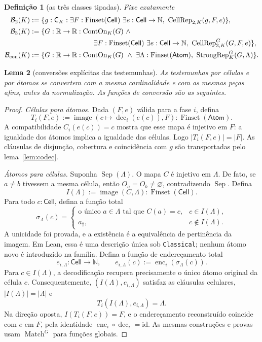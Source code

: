 \documentclass[11pt,a4paper]{article}
\newtheorem{definicao}{Definição}[section]
\newtheorem{lema}[definicao]{Lema}
\newcommand{\N}{\mathbb N}
\newcommand{\R}{\mathbb R}
\newcommand{\Atoms}{\mathsf{Atom}}
\newcommand{\Cell}{\mathsf{Cell}}
\newcommand{\CK}{\mathsf C_K}
\newcommand{\FS}{\operatorname{Finset}}
\newcommand{\Sep}{\operatorname{Sep}}
\newcommand{\Match}{\operatorname{Match}}
\newcommand{\Str}{\operatorname{StrongRep}}
\newcommand{\dec}{\operatorname{dec}}
\newcommand{\enc}{\operatorname{enc}}
\newcommand{\code}[1]{\nolinkurl{#1}}
\begin{document}
\begin{definicao}[as três classes tipadas]\label{def:threeclasses}
Fixe exatamente
\begin{align*}
 \mathcal B_2(K)&:=
 \{g:\CK:\exists F:\FS(\Cell)\ \exists e:\Cell\to\N,\
                  \operatorname{CellRep}_{2,K}(g,F,e)\},\\
 \mathcal B_3(K)&:=
 \{G:\R\to\R:\operatorname{ContOn}_K(G)\ \land\\
 &\hspace{32mm}\exists F:\FS(\Cell)\ \exists e:\Cell\to\N,\
                   \operatorname{CellRep}^G_{3,K}(G,F,e)\},\\
 \mathcal B_{\rm con}(K)&:=
 \{G:\R\to\R:\operatorname{ContOn}_K(G)\ \land\
                  \exists\Lambda:\FS(\Atoms),\ \Str^G_K(G,\Lambda)\}.
\end{align*}
\end{definicao}

\begin{lema}[conversões explícitas das testemunhas]\label{lem:witnesses}
As testemunhas por células e por átomos se convertem com a mesma
cardinalidade e com as mesmas peças afins, antes da normalização.
As funções de conversão são as seguintes.
\end{lema}
\begin{proof}
\emph{Células para átomos.} Dada $(F,e)$ válida para a fase $i$,
defina
\[
 T_i(F,e):=\operatorname{image}
             (c\mapsto\dec_i(e(c)),F):\FS(\Atoms).
\]
A compatibilidade $C_i(e(c))=c$ mostra que esse mapa é injetivo em
$F$: a igualdade dos átomos implica a igualdade das células.
Logo $|T_i(F,e)|=|F|$. As cláusulas de disjunção, cobertura e
coincidência com $g$ são transportadas pelo lema~\ref{lem:codec}.

\emph{Átomos para células.} Suponha $\Sep(\Lambda)$. O mapa
$C$ é injetivo em $\Lambda$. De fato, se $a\ne b$ tivessem a
mesma célula, então $O_a=O_b\ne\varnothing$, contradizendo
$\Sep$. Defina
\[
 I(\Lambda):=\operatorname{image}(C,\Lambda):\FS(\Cell).
\]
Para todo $c:\Cell$, defina a função total
\[
 \sigma_\Lambda(c)=
 \begin{cases}
 \text{o único }a\in\Lambda\text{ tal que }C(a)=c,
                                      &c\in I(\Lambda),\\
 a_\dagger,                            &c\notin I(\Lambda).
 \end{cases}
\]
A unicidade foi provada, e a existência é a equivalência de
pertinência da imagem. Em Lean, essa é uma descrição única sob
\code{Classical}; nenhum átomo novo é introduzido na família.
Defina a função de endereçamento total
\[
 e_{i,\Lambda}:\Cell\to\N,\qquad
 e_{i,\Lambda}(c):=\enc_i(\sigma_\Lambda(c)).
\]
Para $c\in I(\Lambda)$, a decodificação recupera precisamente o
único átomo original da célula $c$. Consequentemente,
$(I(\Lambda),e_{i,\Lambda})$ satisfaz as cláusulas celulares,
$|I(\Lambda)|=|\Lambda|$ e
\[
 T_i(I(\Lambda),e_{i,\Lambda})=\Lambda.
\]
Na direção oposta, $I(T_i(F,e))=F$, e o endereçamento reconstruído
coincide com $e$ em $F$, pela identidade $\enc_i\circ\dec_i=\mathrm{id}$.
As mesmas construções e provas usam $\Match^G$ para funções globais.
\end{proof}
\end{document}
